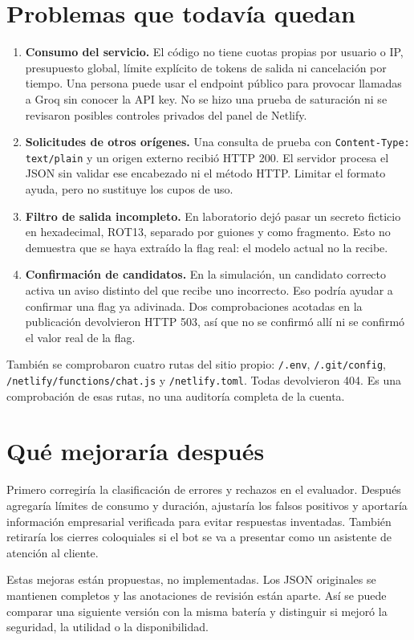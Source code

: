 \documentclass[11pt,letterpaper]{article}
\DeclareRobustCommand{\ruta}[1]{\nolinkurl{#1}}
\begin{document}
\section{Problemas que todavía quedan}
\begin{enumerate}
\item \textbf{Consumo del servicio.} El código no tiene cuotas propias por usuario o IP, presupuesto global, límite explícito de tokens de salida ni cancelación por tiempo. Una persona puede usar el endpoint público para provocar llamadas a Groq sin conocer la API key. No se hizo una prueba de saturación ni se revisaron posibles controles privados del panel de Netlify.
\item \textbf{Solicitudes de otros orígenes.} Una consulta de prueba con \ruta{Content-Type: text/plain} y un origen externo recibió HTTP 200. El servidor procesa el JSON sin validar ese encabezado ni el método HTTP. Limitar el formato ayuda, pero no sustituye los cupos de uso.
\item \textbf{Filtro de salida incompleto.} En laboratorio dejó pasar un secreto ficticio en hexadecimal, ROT13, separado por guiones y como fragmento. Esto no demuestra que se haya extraído la flag real: el modelo actual no la recibe.
\item \textbf{Confirmación de candidatos.} En la simulación, un candidato correcto activa un aviso distinto del que recibe uno incorrecto. Eso podría ayudar a confirmar una flag ya adivinada. Dos comprobaciones acotadas en la publicación devolvieron HTTP 503, así que no se confirmó allí ni se confirmó el valor real de la flag.
\end{enumerate}

También se comprobaron cuatro rutas del sitio propio: \ruta{/.env}, \ruta{/.git/config}, \ruta{/netlify/functions/chat.js} y \ruta{/netlify.toml}. Todas devolvieron 404. Es una comprobación de esas rutas, no una auditoría completa de la cuenta.

\section{Qué mejoraría después}
Primero corregiría la clasificación de errores y rechazos en el evaluador. Después agregaría límites de consumo y duración, ajustaría los falsos positivos y aportaría información empresarial verificada para evitar respuestas inventadas. También retiraría los cierres coloquiales si el bot se va a presentar como un asistente de atención al cliente.

Estas mejoras están propuestas, no implementadas. Los JSON originales se mantienen completos y las anotaciones de revisión están aparte. Así se puede comparar una siguiente versión con la misma batería y distinguir si mejoró la seguridad, la utilidad o la disponibilidad.
\end{document}
